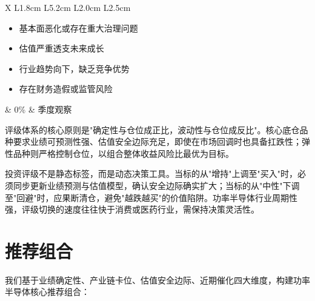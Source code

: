 \begin{exhibitbox}[表 11-1：投资评级体系与配置标准]
\begin{tabularx}{\textwidth}{X L{1.8cm} L{5.2cm} L{2.0cm} L{2.5cm}}
\begin{itemize}[leftmargin=1.2em, topsep=0pt, partopsep=0pt]
  \item 基本面恶化或存在重大治理问题
  \item 估值严重透支未来成长
  \item 行业趋势向下，缺乏竞争优势
  \item 存在财务造假或监管风险
\end{itemize}\vspace{-0.8em} & 0\% & 季度观察 \\
\bottomrule
\end{tabularx}
\end{exhibitbox}

评级体系的核心原则是"确定性与仓位成正比，波动性与仓位成反比"。核心底仓品种要求业绩可预测性强、估值安全边际充足，即使在市场回调时也具备扛跌性；弹性品种则严格控制仓位，以组合整体收益风险比最优为目标。

\begin{keyinsight}[评级体系执行要点]
投资评级不是静态标签，而是动态决策工具。当标的从"增持"上调至"买入"时，必须同步更新业绩预测与估值模型，确认安全边际确实扩大；当标的从"中性"下调至"回避"时，应果断清仓，避免"越跌越买"的价值陷阱。功率半导体行业周期性强，评级切换的速度往往快于消费或医药行业，需保持决策灵活性。
\end{keyinsight}


\clearpage
\section{推荐组合}

我们基于业绩确定性、产业链卡位、估值安全边际、近期催化四大维度，构建功率半导体核心推荐组合：

